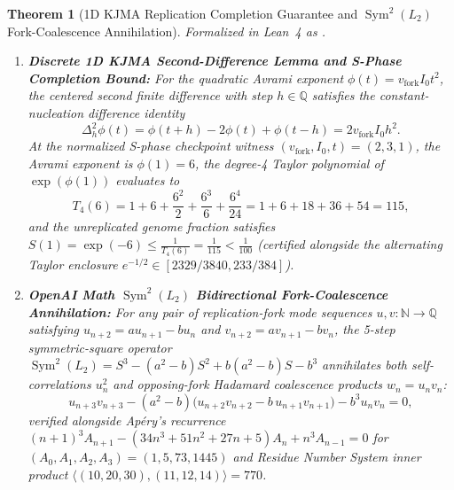 \documentclass[11pt,a4paper]{article}
\newtheorem{theorem}{Theorem}[section]
\theoremstyle{definition}
\begin{document}
\begin{theorem}[1D KJMA Replication Completion Guarantee and $\operatorname{Sym}^2(L_2)$ Fork-Coalescence Annihilation]
\label{thm:kjma_sym2_coalescence}
Formalized in Lean~4 as \texttt{}.
\begin{enumerate}
  \item \textbf{Discrete 1D KJMA Second-Difference Lemma and S-Phase Completion Bound:} For the quadratic Avrami exponent $\phi(t) = v_{\mathrm{fork}} I_0 t^2$, the centered second finite difference with step $h \in \mathbb{Q}$ satisfies the constant-nucleation difference identity
  \begin{equation}
    \Delta_h^2 \phi(t) = \phi(t+h) - 2\phi(t) + \phi(t-h) = 2 v_{\mathrm{fork}} I_0 h^2.
  \end{equation}
  At the normalized S-phase checkpoint witness $(v_{\mathrm{fork}}, I_0, t) = (2, 3, 1)$, the Avrami exponent is $\phi(1) = 6$, the degree-4 Taylor polynomial of $\exp(\phi(1))$ evaluates to
  \begin{equation}
    T_4(6) = 1 + 6 + \frac{6^2}{2} + \frac{6^3}{6} + \frac{6^4}{24} = 1 + 6 + 18 + 36 + 54 = 115,
  \end{equation}
  and the unreplicated genome fraction satisfies $S(1) = \exp(-6) \le \frac{1}{T_4(6)} = \frac{1}{115} < \frac{1}{100}$ (certified alongside the alternating Taylor enclosure $e^{-1/2} \in [2329/3840, 233/384]$).
  \item \textbf{OpenAI Math $\operatorname{Sym}^2(L_2)$ Bidirectional Fork-Coalescence Annihilation:} For any pair of replication-fork mode sequences $u, v : \mathbb{N} \to \mathbb{Q}$ satisfying $u_{n+2} = a u_{n+1} - b u_n$ and $v_{n+2} = a v_{n+1} - b v_n$, the 5-step symmetric-square operator $\operatorname{Sym}^2(L_2) = S^3 - (a^2 - b)S^2 + b(a^2 - b)S - b^3$ annihilates both self-correlations $u_n^2$ and opposing-fork Hadamard coalescence products $w_n = u_n v_n$:
  \begin{equation}
    u_{n+3}v_{n+3} - (a^2 - b)\bigl(u_{n+2}v_{n+2} - b\,u_{n+1}v_{n+1}\bigr) - b^3 u_n v_n = 0,
  \end{equation}
  verified alongside Ap\'ery's recurrence $(n+1)^3 A_{n+1} - (34n^3 + 51n^2 + 27n + 5)A_n + n^3 A_{n-1} = 0$ for $(A_0, A_1, A_2, A_3) = (1, 5, 73, 1445)$ and Residue Number System inner product $\langle(10, 20, 30), (11, 12, 14)\rangle = 770$.
\end{enumerate}
\end{theorem}
\end{document}
